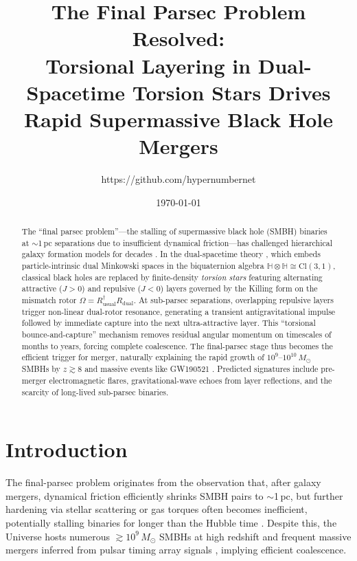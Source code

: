 \documentclass[dvipdfmx,11pt,a4paper]{article}
\title{The Final Parsec Problem Resolved:\\Torsional Layering in Dual-Spacetime Torsion Stars Drives Rapid Supermassive Black Hole Mergers}
\author{https://github.com/hypernumbernet}
\date{\today}
\begin{document}
\maketitle

\begin{abstract}
The ``final parsec problem''—the stalling of supermassive black hole (SMBH) binaries at $\sim$1\,pc separations due to insufficient dynamical friction—has challenged hierarchical galaxy formation models for decades \citep{Begelman1980,Milosavljevic2005}.
In the dual-spacetime theory \citep{dual2025}, which embeds particle-intrinsic dual Minkowski spaces in the biquaternion algebra $\mathbb{H}\otimes\mathbb{H}\cong\mathrm{Cl}(3,1)$, classical black holes are replaced by finite-density \emph{torsion stars} featuring alternating attractive ($J>0$) and repulsive ($J<0$) layers governed by the Killing form on the mismatch rotor $\Omega=R_\text{usual}^\dagger R_\text{dual}$.  
At sub-parsec separations, overlapping repulsive layers trigger non-linear dual-rotor resonance, generating a transient antigravitational impulse followed by immediate capture into the next ultra-attractive layer. This ``torsional bounce-and-capture'' mechanism removes residual angular momentum on timescales of months to years, forcing complete coalescence.  
The final-parsec stage thus becomes the efficient trigger for merger, naturally explaining the rapid growth of $10^{9}$--$10^{10}\,M_\odot$ SMBHs by $z\gtrsim 8$ \citep{Tripodi2025} and massive events like GW190521 \citep{LVC2020a,LVC2020b}.  
Predicted signatures include pre-merger electromagnetic flares, gravitational-wave echoes from layer reflections, and the scarcity of long-lived sub-parsec binaries.
\end{abstract}

\section{Introduction}

The final-parsec problem originates from the observation that, after galaxy mergers, dynamical friction efficiently shrinks SMBH pairs to $\sim$1\,pc, but further hardening via stellar scattering or gas torques often becomes inefficient, potentially stalling binaries for longer than the Hubble time \citep{Begelman1980,Milosavljevic2005,Khan2016}.  
Despite this, the Universe hosts numerous $\gtrsim 10^{9}\,M_\odot$ SMBHs at high redshift \citep[e.g.,][]{Fan2023,Tripodi2025} and frequent massive mergers inferred from pulsar timing array signals \citep{NANOGrav2023}, implying efficient coalescence.
\end{document}
